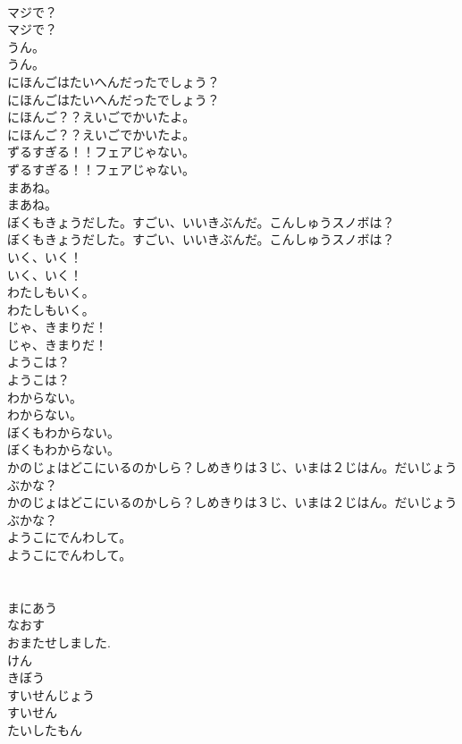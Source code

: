 \documentclass[8pt]{extreport}
\begin{document}
\begin{CJK}{UTF8}{min}
\\	マジで？	
\\	マジで？ 
\\	うん。	
\\	うん。 
\\	にほんごはたいへんだったでしょう？	
\\	にほんごはたいへんだったでしょう？ 
\\	にほんご？？えいごでかいたよ。	
\\	にほんご？？えいごでかいたよ。 
\\	ずるすぎる！！フェアじゃない。	
\\	ずるすぎる！！フェアじゃない。 
\\	まあね。	
\\	まあね。 
\\	ぼくもきょうだした。すごい、いいきぶんだ。こんしゅうスノボは？	
\\	ぼくもきょうだした。すごい、いいきぶんだ。こんしゅうスノボは？ 
\\	いく、いく！	
\\	いく、いく！ 
\\	わたしもいく。	
\\	わたしもいく。 
\\	じゃ、きまりだ！	
\\	じゃ、きまりだ！ 
\\	ようこは？	
\\	ようこは？ 
\\	わからない。	
\\	わからない。 
\\	ぼくもわからない。	
\\	ぼくもわからない。 
\\	かのじょはどこにいるのかしら？しめきりは３じ、いまは２じはん。だいじょうぶかな？	
\\	かのじょはどこにいるのかしら？しめきりは３じ、いまは２じはん。だいじょうぶかな？ 
\\	ようこにでんわして。	
\\	ようこにでんわして。 
\\	[でんわをかける・・・]	
\\	[でんわをかける・・・] 
\\	まにあう
\\	なおす
\\	おまたせしました.
\\	けん
\\	きぼう
\\	すいせんじょう
\\	すいせん
\\	たいしたもん

\end{CJK}
\end{document}
